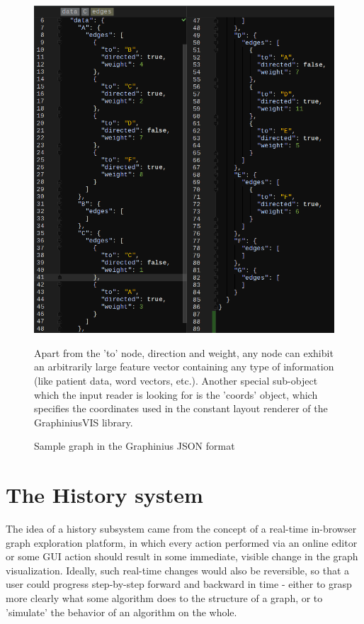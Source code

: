 		\begin{figure}[ht]
			\centering
			\hspace*{-1.5cm}
			\includegraphics[width=1.2\textwidth]{figures/search_graph_json}
			\caption{Sample graph in the Graphinius JSON format}
			\label{fig:json_input_graph}
			\small Apart from the 'to' node, direction and weight, any node can exhibit an arbitrarily large feature vector containing any type of information (like patient data, word vectors, etc.). Another special sub-object which the input reader is looking for is the 'coords' object, which specifies the coordinates used in the constant layout renderer of the GraphiniusVIS library.
		\end{figure}



\section{The History system}
\label{sect:op_log}

	The idea of a history subsystem came from the concept of a real-time in-browser graph exploration platform, in which every action performed via an online editor or some GUI action should result in some immediate, visible change in the graph visualization. Ideally, such real-time changes would also be reversible, so that a user could progress step-by-step forward and backward in time - either to grasp more clearly what some algorithm does to the structure of a graph, or to 'simulate' the behavior of an algorithm on the whole. 
	
